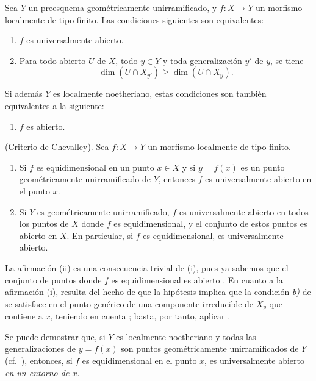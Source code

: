 \begin{corollary}[14.4.3]
\label{IV.14.4.3}
Sea $Y$ un preesquema geométricamente unirramificado, y $f:X\to Y$ un morfismo localmente de tipo finito.
Las condiciones siguientes son equivalentes:
\begin{enumerate}[label=\emph{\alph*)}]
  \item $f$ es universalmente abierto.
  \item Para todo abierto $U$ de $X$, todo $y\in Y$ y toda generalización $y'$ de $y$, se tiene
    \[
      \dim(U\cap X_{y'})\geq\dim(U\cap X_y).
    \]
\end{enumerate}
Si además $Y$ es localmente noetheriano, estas condiciones son también equivalentes a la siguiente:
\begin{enumerate}[label=\emph{\alph*)}]
  \item[\emph{c)}] $f$ es abierto.
\end{enumerate}
\end{corollary}

\begin{corollary}[14.4.4]
\label{IV.14.4.4}
(Criterio de Chevalley).
Sea $f:X\to Y$ un morfismo localmente de tipo finito.
\begin{enumerate}[label=\textup{(\roman*)}]
  \item Si $f$ es equidimensional en un punto $x\in X$  y si $y=f(x)$ es un punto geométricamente unirramificado de $Y$, entonces $f$ es universalmente abierto en el punto $x$.
  \item Si $Y$ es geométricamente unirramificado, $f$ es universalmente abierto en todos los puntos de $X$ donde $f$ es equidimensional, y el conjunto de estos puntos es abierto en $X$.
 En particular, si $f$ es equidimensional, es universalmente abierto.
\end{enumerate}
\end{corollary}

La afirmación (ii) es una consecuencia trivial de (i), pues ya sabemos que el conjunto de puntos donde $f$ es equidimensional es abierto .
En cuanto a la afirmación (i), resulta del hecho de que la hipótesis implica que la condición \emph{b)} de  se satisface en el punto genérico de una componente irreducible de $X_y$ que contiene a $x$, teniendo en cuenta ; basta, por tanto, aplicar .

\begin{remark}[14.4.5]
\label{IV.14.4.5}
Se puede demostrar que, si $Y$ es localmente noetheriano y todas las generalizaciones de $y=f(x)$ son puntos geométricamente unirramificados de $Y$ (cf.\ ), entonces, si $f$ es equidimensional en el punto $x$, es universalmente abierto \emph{en un entorno de $x$}.
\end{remark}

